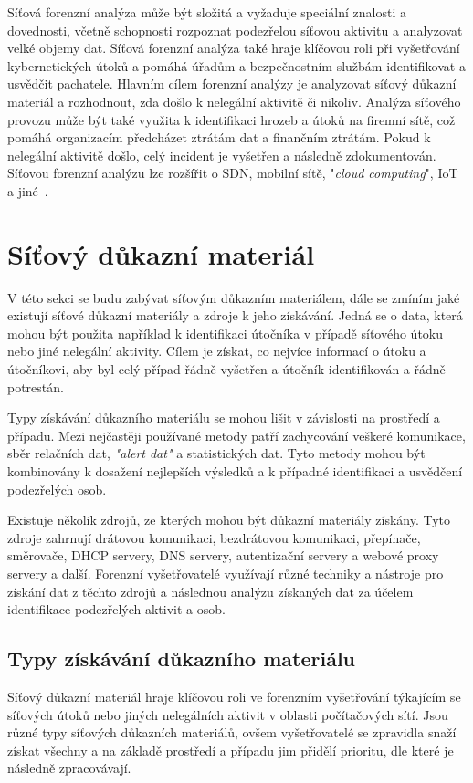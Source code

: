     Síťová forenzní analýza může být složitá a vyžaduje speciální znalosti a dovednosti, včetně schopnosti rozpoznat podezřelou síťovou aktivitu a analyzovat velké objemy dat. Síťová forenzní analýza také hraje klíčovou roli při vyšetřování kybernetických útoků a pomáhá úřadům a bezpečnostním službám identifikovat a usvědčit pachatele. Hlavním cílem forenzní analýzy je analyzovat síťový důkazní materiál a rozhodnout, zda došlo k nelegální aktivitě či nikoliv. Analýza síťového provozu může být také využita k identifikaci hrozeb a útoků na firemní sítě, což pomáhá organizacím předcházet ztrátám dat a finančním ztrátám. Pokud k nelegální aktivitě došlo, celý incident je vyšetřen a následně zdokumentován. Síťovou forenzní analýzu lze rozšířit o \gls{SDN}, mobilní sítě, "\textit{cloud computing}", \gls{IoT} a jiné~\cite{ZembjakovaReference}.

\section{Síťový důkazní materiál}
    V této sekci se budu zabývat síťovým důkazním materiálem, dále se zmíním jaké existují síťové důkazní materiály a zdroje k jeho získávání. Jedná se o data, která mohou být použita například k identifikaci útočníka v případě síťového útoku nebo jiné nelegální aktivity. Cílem je získat, co nejvíce informací o útoku a útočníkovi, aby byl celý případ řádně vyšetřen a útočník identifikován a řádně potrestán.

    Typy získávání důkazního materiálu se mohou lišit v závislosti na prostředí a případu. Mezi nejčastěji používané metody patří zachycování veškeré komunikace, sběr relačních dat, \textit{"alert dat"} a statistických dat. Tyto metody mohou být kombinovány k dosažení nejlepších výsledků a k případné identifikaci a usvědčení podezřelých osob.

    Existuje několik zdrojů, ze kterých mohou být důkazní materiály získány. Tyto zdroje zahrnují drátovou komunikaci, bezdrátovou komunikaci, přepínače, směrovače, DHCP servery, DNS servery, autentizační servery a webové proxy servery a další. Forenzní vyšetřovatelé využívají různé techniky a nástroje pro získání dat z těchto zdrojů a následnou analýzu získaných dat za účelem identifikace podezřelých aktivit a osob.
    
    \subsection{Typy získávání důkazního materiálu}
        Síťový důkazní materiál hraje klíčovou roli ve forenzním vyšetřování týkajícím se síťových útoků nebo jiných nelegálních aktivit v oblasti počítačových sítí. Jsou různé typy síťových důkazních materiálů, ovšem vyšetřovatelé se zpravidla snaží získat všechny a na základě prostředí a případu jim přidělí prioritu, dle které je následně zpracovávají. 
        
